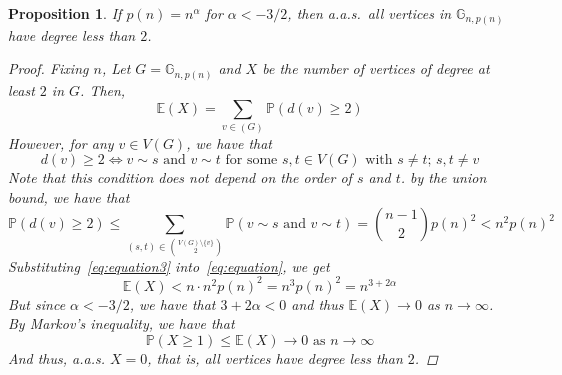 \documentclass{amsart}
\theoremstyle{plain}
\newtheorem*{proposition}{\textbf{Proposition}}
\theoremstyle{definition}
\begin{document}
    \begin{proposition}
        If $p(n) = n^{\alpha}$ for $\alpha < -3/2$, then a.a.s.\
        all vertices in $\mathbb{G}_{n, p(n)}$ have degree less than $2$.

        \begin{proof}
            \vspace{-3mm}
            Fixing $n$, Let $G = \mathbb{G}_{n, p(n)}$ and $X$
            be the number of vertices of degree at least $2$ in $G$.
            Then,
            \begin{equation}
                \mathbb{E}(X) = \sum_{v\in(G)} \mathbb{P}(d(v) \geq 2)\label{eq:equation}
            \end{equation}
            However, for any $v \in V(G)$, we have that
            \begin{equation}
                d(v) \geq 2 \iff v \sim s \text{ and } v \sim t \text{ for some }
                s, t \in V(G) \text{ with } s \neq t; \, s, t \neq v
                \label{eq:equation2}
            \end{equation}
            Note that this condition does not depend on the order of $s$ and $t$.
            by the union bound, we have that
            \begin{equation}
                \mathbb{P}(d(v) \geq 2) \leq
                \sum_{(s, t) \in \binom{V(G) \setminus \{v\}}{2}} \mathbb{P}(v \sim s \text{ and } v \sim t) =
                \binom{n-1}{2} p(n)^2 < n^2 p(n)^2
                \label{eq:equation3}
            \end{equation}
            Substituting~\eqref{eq:equation3} into~\eqref{eq:equation}, we get
            \begin{equation}
                \mathbb{E}(X) < n \cdot n^2 p(n)^2 = n^3 p(n)^2 = n^{3 + 2\alpha}
                \label{eq:equation4}
            \end{equation}
            But since $\alpha < -3/2$, we have that $3 + 2\alpha < 0$ and thus $\mathbb{E}(X) \to 0$ as $n \to \infty$.
            By Markov's inequality, we have that
            \begin{equation}
                \mathbb{P}(X \geq 1) \leq \mathbb{E}(X) \to 0 \text{ as } n \to \infty
                \label{eq:equation5}
            \end{equation}
            And thus, a.a.s. $X = 0$, that is, all vertices have degree less than $2$.
        \end{proof}
    \end{proposition}
\end{document}
